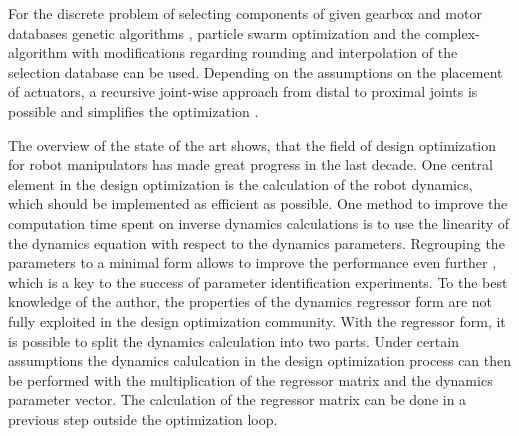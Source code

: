 \documentclass{svproc}
\begin{document}
For the discrete problem of selecting components of given gearbox and motor databases genetic algorithms \cite{TarkianPerOelFen2011,Padilla-GarciaCruRod2015}, particle swarm optimization \cite{RamirezKotOrt2017} and the complex-algorithm with modifications regarding rounding and interpolation of the selection database \cite{PetterssonAndKru2005,ZhouBaiHan2011} can be used.
Depending on the assumptions on the placement of actuators, a recursive joint-wise approach from distal to proximal joints is possible and simplifies the optimization \cite{ChedmailGau1990}.




The overview of the state of the art shows, that the field of design optimization for robot manipulators has made great progress in the last decade.
One central element in the design optimization is the calculation of the robot dynamics, which should be implemented as efficient as possible.
One method to improve the computation time spent on inverse dynamics calculations is to use the linearity of the dynamics equation with respect to the dynamics parameters.
Regrouping the parameters to a minimal form allows to improve the performance even further \cite{KhalilDom2002}, which is a key to the success of parameter identification experiments.
To the best knowledge of the author, the properties of the dynamics regressor form are not fully exploited in the design optimization community.
With the regressor form, it is possible to split the dynamics calculation into two parts.
Under certain assumptions the dynamics calulcation in the design optimization process can then be performed with the multiplication of the regressor matrix and the dynamics parameter vector.
The calculation of the regressor matrix can be done in a previous step outside the optimization loop.
\end{document}
